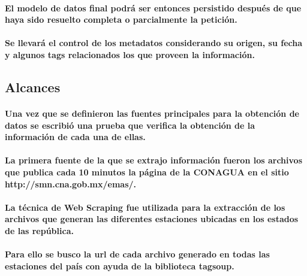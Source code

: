   \paragraph{El modelo de datos final podrá ser entonces persistido después de que haya sido resuelto completa o parcialmente la petición.} 
  \paragraph{Se llevará el control de los metadatos considerando su origen, su fecha y algunos tags relacionados los que proveen la información.}
  \newpage

  \subsection{Alcances}
  
    \paragraph{Una vez que se definieron las fuentes principales para la obtención de datos se escribió una prueba que verifica la obtención de la información de cada una de ellas.} 
    \paragraph{La primera fuente de la que se extrajo información fueron los archivos que publica cada 10 minutos la página de la CONAGUA en el sitio \textbf{http://smn.cna.gob.mx/emas/}.}
    \paragraph{La técnica de Web Scraping fue utilizada para la extracción de los archivos que generan las diferentes estaciones ubicadas en los estados de las república.}
    \paragraph{Para ello se busco la url de cada archivo generado en todas las estaciones del país con ayuda de la biblioteca \textbf{tagsoup}.}
